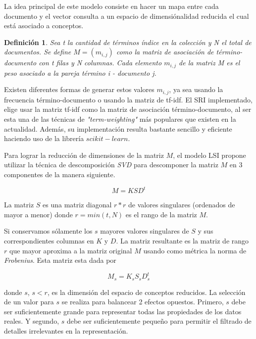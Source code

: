 \documentclass[a4paper, 10pt]{article}
\newtheorem{definition}{Definici\'on}
\begin{document}
	La idea principal de este modelo consiste en hacer un mapa entre cada documento y el vector consulta a un espacio 
	de dimensi\'onalidad reducida el cual est\'a asociado a conceptos.
	
	\begin{definition}
		Sea t la cantidad de t\'erminos \'indice en la colecci\'on y N el total de documentos. Se define $M=(m_{i,j})$ 
		como la matriz de asociaci\'on de t\'ermino-documento con t filas y N columnas. 
		Cada elemento $m_{i, j}$ de la matriz M es el peso asociado a la pareja t\'ermino i - documento j. 
	\end{definition}
	
	Existen diferentes formas de generar estos valores $m_{i,j}$, ya sea usando la frecuencia t\'ermino-documento 
	o usando la matriz de tf-idf. El SRI implementado, elige usar la matriz tf-idf como la matriz de asociaci\'on 
	t\'ermino-documento, al ser esta una de las t\'ecnicas de \textit{"term-weighting"} m\'as populares que existen 
	en la actualidad. Adem\'as, su implementaci\'on resulta bastante sencillo y eficiente haciendo uso de la librer\'ia $scikit-learn$.
	
	Para lograr la reducci\'on de dimensiones de la matriz $M$, el modelo LSI propone utilizar la 
	t\'ecnica de descomposici\'on \textit{SVD} para descomponer la matriz $M$ en 3 componentes de la manera siguiente.

	\begin{equation}
		M = KSD^t
	\end{equation}
	
	La matriz $S$ es una matriz diagonal $r*r$ de valores singulares (ordenados de mayor a menor) donde $r = min(t, N)$ es el rango de la matriz $M$.
	
	Si conservamos s\'olamente los $s$ mayores valores singulares de $S$ y sus correspondientes columnas en $K$ y $D$.
	La matriz resultante es la matriz de rango $r$ que mayor aproxima a la matriz original $M$ usando como m\'etrica la
    norma de \textit{Frobenius}. Esta matriz esta dada por
	
	\begin{equation}		
		M_s = K_sS_sD^t_s
	\end{equation}

	donde $s$, $s < r$, es la dimensión del espacio de conceptos reducidos. La selecci\'on de un valor para $s$ se
	realiza para balancear 2 efectos opuestos. Primero, $s$ debe ser suficientemente grande para representar todas las propiedades
	de los datos reales. Y segundo, $s$ debe ser suficientemente peque\~no para permitir el filtrado de detalles irrelevantes
	en la representaci\'on.
\end{document}
